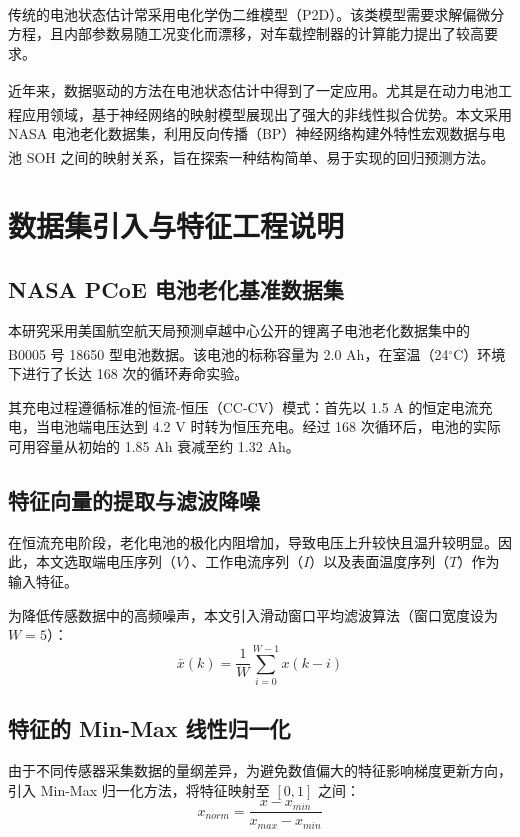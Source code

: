 \documentclass[twocolumn,10pt,a4paper,twoside]{ctexart}
\newcommand{\upcite}[1]{\textsuperscript{\cite{#1}}}
\begin{document}
传统的电池状态估计常采用电化学伪二维模型（P2D）\upcite{ref4}。该类模型需要求解偏微分方程，且内部参数易随工况变化而漂移，对车载控制器的计算能力提出了较高要求。

近年来，数据驱动的方法在电池状态估计中得到了一定应用\upcite{ref1, ref2}。尤其是在动力电池工程应用领域，基于神经网络的映射模型展现出了强大的非线性拟合优势\upcite{ref7}。本文采用 NASA 电池老化数据集，利用反向传播（BP）神经网络构建外特性宏观数据与电池 SOH 之间的映射关系，旨在探索一种结构简单、易于实现的回归预测方法\upcite{ref6}。

\section{数据集引入与特征工程说明}

\subsection{NASA PCoE 电池老化基准数据集}
本研究采用美国航空航天局预测卓越中心公开的锂离子电池老化数据集中的 B0005 号 18650 型电池数据\upcite{ref5}。该电池的标称容量为 2.0 Ah，在室温（24$^\circ$C）环境下进行了长达 168 次的循环寿命实验。

其充电过程遵循标准的恒流-恒压（CC-CV）模式：首先以 1.5 A 的恒定电流充电，当电池端电压达到 4.2 V 时转为恒压充电。经过 168 次循环后，电池的实际可用容量从初始的 1.85 Ah 衰减至约 1.32 Ah。

\subsection{特征向量的提取与滤波降噪}
在恒流充电阶段，老化电池的极化内阻增加，导致电压上升较快且温升较明显。因此，本文选取端电压序列（$V$）、工作电流序列（$I$）以及表面温度序列（$T$）作为输入特征。

为降低传感数据中的高频噪声，本文引入滑动窗口平均滤波算法（窗口宽度设为 $W=5$）：
\begin{equation}
    \bar{x}(k) = \frac{1}{W} \sum_{i=0}^{W-1} x(k-i)
\end{equation}

\subsection{特征的 Min-Max 线性归一化}
由于不同传感器采集数据的量纲差异，为避免数值偏大的特征影响梯度更新方向，引入 Min-Max 归一化方法，将特征映射至 $[0, 1]$ 之间：
\begin{equation}
    x_{norm} = \frac{x - x_{min}}{x_{max} - x_{min}}
\end{equation}
\end{document}
